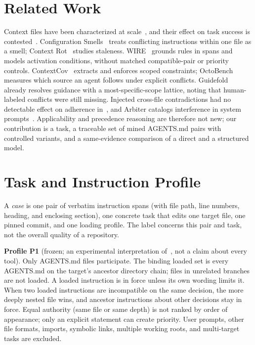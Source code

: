 \section{Related Work}\label{sec:related}
Context files have been characterized at scale~\cite{chatlatanagulchai2026agentreadmes,galster2026dataset}, and their
effect on task success is contested~\cite{gloaguen2026evaluating}. Configuration Smells~\cite{santos2026smells} treats
conflicting instructions within one file as a smell; Context Rot~\cite{treude2026contextrot} studies staleness.
WIRE~\cite{yan2026wire} grounds rules in spans and models activation conditions, without matched compatible-pair or
priority controls. ContextCov~\cite{sharma2026contextcov} extracts and enforces scoped constraints;
OctoBench~\cite{ding2026octobench} measures which source an agent follows under explicit conflicts.
Guidefold~\cite{guidefold} already resolves guidance with a most-specific-scope lattice, noting that human-labeled
conflicts were still missing. Injected cross-file contradictions had no detectable effect on adherence
in~\cite{mcmillan2026adherence}, and Arbiter catalogs interference in system prompts~\cite{mason2026arbiter}.
Applicability and precedence reasoning are therefore not new; our contribution is a task, a traceable set of mined
AGENTS.md pairs with controlled variants, and a same-evidence comparison of a direct and a structured model.

\section{Task and Instruction Profile}\label{sec:task}
A \emph{case} is one pair of verbatim instruction spans (with file path, line numbers, heading, and enclosing section),
one concrete task that edits one target file, one pinned commit, and one loading profile. The label concerns this pair
and task, not the overall quality of a repository.

\textbf{Profile P1} (frozen; an experimental interpretation of~\cite{agentsmd}, not a claim about every tool). Only
AGENTS.md files participate. The binding loaded set is every AGENTS.md on the target's ancestor directory chain; files
in unrelated branches are not loaded. A loaded instruction is in force unless its own wording limits it. When two loaded
instructions are incompatible on the same decision, the more deeply nested file wins, and ancestor instructions about
other decisions stay in force. Equal authority (same file or same depth) is not ranked by order of appearance; only an
explicit statement can create priority. User prompts, other file formats, imports, symbolic links, multiple working
roots, and multi-target tasks are excluded.

